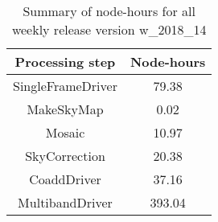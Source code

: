 \begin{table}[h]
  \centering
  \begin{tabular} {|c|c|}
    \hline
    Processing step & Node-hours \\
    \hline
    SingleFrameDriver &  79.38 \\ 
    MakeSkyMap        &   0.02 \\
    Mosaic            &  10.97 \\
    SkyCorrection     &  20.38 \\
    CoaddDriver       &  37.16 \\
    MultibandDriver   & 393.04 \\
    \hline
  \end{tabular}
  \caption{Summary of node-hours for all weekly release version w\_2018\_14}
  \label{tbl:PerTask14}
\end{table}
